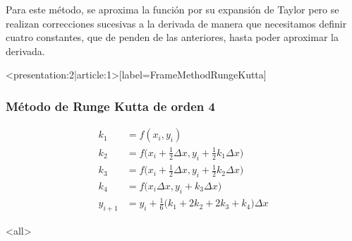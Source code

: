Para este método, se aproxima la función por su expansión de Taylor pero se
realizan correcciones sucesivas a la derivada de manera que necesitamos definir
cuatro constantes, que de penden de las anteriores, hasta poder aproximar la
derivada. 
\mode*
\begin{frame}<presentation:2|article:1>[label=FrameMethodRungeKutta]
  \frametitle<presentation>{Método de Runge Kutta de orden 4}
  \center
    \begin{equation}
      \begin{aligned}
	k_1 &= f(x_i, y_i)\\
	k_2 &= f \Big( x_i + \frac{1}{2} \Delta x, y_i + \frac{1}{2} k_1 \Delta x \Big)\\
	k_3 &= f \Big( x_i + \frac{1}{2} \Delta x, y_i + \frac{1}{2} k_2 \Delta x \Big)\\
	k_4 &= f \Big( x_i \Delta x, y_i + k_3 \Delta x \Big)\\
	y_{i+1} &= y_i+\frac{1}{6} \Big( k_1 + 2 k_2 + 2 k_3 + k_4 \Big) \Delta x
      \end{aligned}
    \end{equation}
\end{frame}
\mode<all>

